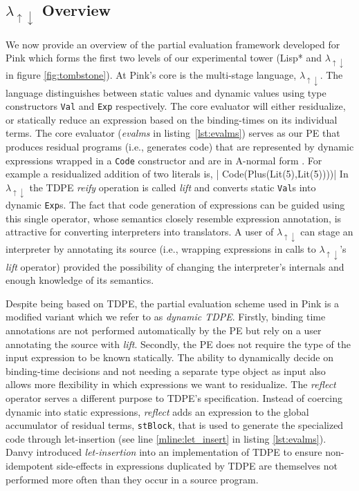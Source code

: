 \documentclass[a4paper,12pt,twoside,openright]{report}
\theoremstyle{definition}
\newcommand{\mslang}{$\lambda_{\uparrow\downarrow}$}
\begin{document}
\subsection{\texorpdfstring{\mslang}{Lg} Overview}\label{subsec:mslang}
We now provide an overview of the partial evaluation framework developed for Pink \cite{amin2017collapsing} which forms the first two levels of our experimental tower (Lisp* and \mslang{} in figure \ref{fig:tombstone}). At Pink's core is the multi-stage language, \mslang{}. The language distinguishes between static values and dynamic values using type constructors \texttt{Val} and \texttt{Exp} respectively. The core evaluator will either residualize, or statically reduce an expression based on the binding-times on its individual terms. The core evaluator (\textit{evalms} in listing~\ref{lst:evalms}) serves as our PE that produces residual programs (i.e., generates code) that are represented by dynamic expressions wrapped in a \texttt{Code} constructor and are in A-normal form \cite{flanagan1993essence}. For example a residualized addition of two literals is,
|    Code(Plus(Lit(5),Lit(5))))|
In \mslang{} the TDPE \textit{reify} operation is called \textit{lift} and converts static \texttt{Val}s into dynamic \texttt{Exp}s. The fact that code generation of expressions can be guided using this single operator, whose semantics closely resemble expression annotation, is attractive for converting interpreters into translators. A user of \mslang{} can stage an interpreter by annotating its source (i.e., wrapping expressions in calls to \mslang{}'s \textit{lift} operator) provided the possibility of changing the interpreter's internals and enough knowledge of its semantics.

Despite being based on TDPE, the partial evaluation scheme used in Pink is a modified variant which we refer to as \textit{dynamic TDPE}. Firstly, binding time annotations are not performed automatically by the PE but rely on a user annotating the source with \textit{lift}. Secondly, the PE does not require the type of the input expression to be known statically. The ability to dynamically decide on binding-time decisions and not needing a separate type object as input also allows more flexibility in which expressions we want to residualize. The \textit{reflect} operator serves a different purpose to TDPE's specification. Instead of coercing dynamic into static expressions, \textit{reflect} adds an expression to the global accumulator of residual terms, \texttt{stBlock}, that is used to generate the specialized code through let-insertion (see line \ref{mline:let_insert} in listing \ref{lst:evalms}). Danvy introduced \textit{let-insertion} into an implementation of TDPE \cite{hatcliff2007partial} to ensure non-idempotent side-effects in expressions duplicated by TDPE are themselves not performed more often than they occur in a source program.
\end{document}
